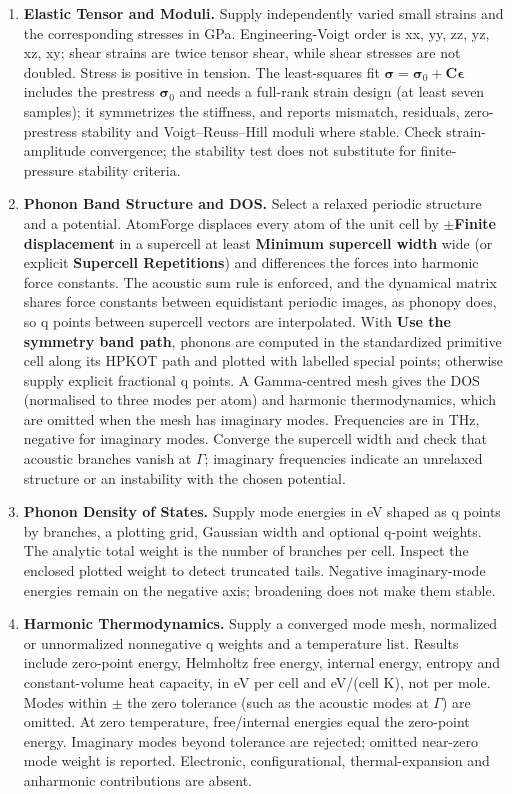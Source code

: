 \begin{enumerate}
\item \textbf{Elastic Tensor and Moduli.} Supply independently varied small strains and the corresponding stresses in GPa. Engineering-Voigt order is xx, yy, zz, yz, xz, xy; shear strains are twice tensor shear, while shear stresses are not doubled. Stress is positive in tension. The least-squares fit $\boldsymbol\sigma=\boldsymbol\sigma_0+\mathbf C\boldsymbol\epsilon$ includes the prestress $\boldsymbol\sigma_0$ and needs a full-rank strain design (at least seven samples); it symmetrizes the stiffness, and reports mismatch, residuals, zero-prestress stability and Voigt--Reuss--Hill moduli where stable. Check strain-amplitude convergence; the stability test does not substitute for finite-pressure stability criteria.
\item \textbf{Phonon Band Structure and DOS.} Select a relaxed periodic structure and a potential. AtomForge displaces every atom of the unit cell by $\pm$\textbf{Finite displacement} in a supercell at least \textbf{Minimum supercell width} wide (or explicit \textbf{Supercell Repetitions}) and differences the forces into harmonic force constants. The acoustic sum rule is enforced, and the dynamical matrix shares force constants between equidistant periodic images, as phonopy does, so q points between supercell vectors are interpolated. With \textbf{Use the symmetry band path}, phonons are computed in the standardized primitive cell along its HPKOT path and plotted with labelled special points; otherwise supply explicit fractional q points. A Gamma-centred mesh gives the DOS (normalised to three modes per atom) and harmonic thermodynamics, which are omitted when the mesh has imaginary modes. Frequencies are in THz, negative for imaginary modes. Converge the supercell width and check that acoustic branches vanish at $\Gamma$; imaginary frequencies indicate an unrelaxed structure or an instability with the chosen potential.
\item \textbf{Phonon Density of States.} Supply mode energies in eV shaped as q points by branches, a plotting grid, Gaussian width and optional q-point weights. The analytic total weight is the number of branches per cell. Inspect the enclosed plotted weight to detect truncated tails. Negative imaginary-mode energies remain on the negative axis; broadening does not make them stable.
\item \textbf{Harmonic Thermodynamics.} Supply a converged mode mesh, normalized or unnormalized nonnegative q weights and a temperature list. Results include zero-point energy, Helmholtz free energy, internal energy, entropy and constant-volume heat capacity, in eV per cell and eV/(cell K), not per mole. Modes within $\pm$ the zero tolerance (such as the acoustic modes at $\Gamma$) are omitted. At zero temperature, free/internal energies equal the zero-point energy. Imaginary modes beyond tolerance are rejected; omitted near-zero mode weight is reported. Electronic, configurational, thermal-expansion and anharmonic contributions are absent.
\end{enumerate}

